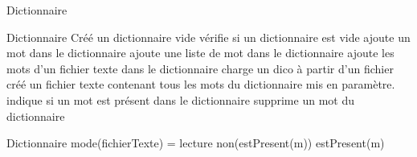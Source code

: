 \begin{tad}
	\begin{tadOperations}{Dictionnaire}
			{}%
			{}
			{}%
			{\tadUnParam{\booleen}}
			{}%
			{}
			{}%
			{}
			{}%
			{}
			{\tadUnParam{\chaine}}%
			{}
			{}%
			{\tadUnParam{\booleen}}
			{}%
			{\tadUnParam{\booleen}}
			{}%
			{}
	\end{tadOperations}
	
	\begin{tadSemantiques}{Dictionnaire}
			{Cr\'e\'e un dictionnaire vide}
			{v\'erifie si un dictionnaire est vide}
			{ajoute un mot dans le dictionnaire}
			{ajoute une liste de mot dans le dictionnaire}
			{ajoute les mots d’un fichier texte dans le dictionnaire}
			{charge un dico \`a partir d’un fichier}
			{cr\'e\'e un fichier texte contenant tous les mots du dictionnaire mis en paramètre.}
			{indique si un mot est pr\'esent dans le dictionnaire}
			{supprime un mot du dictionnaire}
	\end{tadSemantiques}
	
	\begin{tadPreconditions}{Dictionnaire}
			{mode(fichierTexte) = lecture}
			{non(estPresent(m))}
			{estPresent(m)}
	\end{tadPreconditions}
	
\end{tad}
